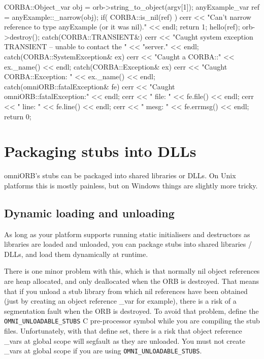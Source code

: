 \documentclass[11pt,twoside,a4paper]{book}
\newcommand{\code}[1]{\texttt{#1}}
\begin{document}
\begin{cxxlisting}
{{    {
      CORBA::Object_var obj = orb->string_to_object(argv[1]);
      anyExample_var ref = anyExample::_narrow(obj);
      if( CORBA::is_nil(ref) ) {
	cerr << "Can't narrow reference to type anyExample (or it was nil)."
	     << endl;
	return 1;
      }
      hello(ref);
    }
    orb->destroy();
  }
  catch(CORBA::TRANSIENT&) {
    cerr << "Caught system exception TRANSIENT -- unable to contact the "
         << "server." << endl;
  }
  catch(CORBA::SystemException& ex) {
    cerr << "Caught a CORBA::" << ex._name() << endl;
  }
  catch(CORBA::Exception& ex) {
    cerr << "Caught CORBA::Exception: " << ex._name() << endl;
  }
  catch(omniORB::fatalException& fe) {
    cerr << "Caught omniORB::fatalException:" << endl;
    cerr << "  file: " << fe.file() << endl;
    cerr << "  line: " << fe.line() << endl;
    cerr << "  mesg: " << fe.errmsg() << endl;
  }
  return 0;
}
\end{cxxlisting}



\chapter{Packaging stubs into DLLs}
\label{chap:dlls}


omniORB's stubs can be packaged into shared libraries or DLLs. On Unix
platforms this is mostly painless, but on Windows things are slightly
more tricky.


\section{Dynamic loading and unloading}

As long as your platform supports running static initialisers and
destructors as libraries are loaded and unloaded, you can package
stubs into shared libraries / DLLs, and load them dynamically at
runtime.

There is one minor problem with this, which is that normally nil
object references are heap allocated, and only deallocated when the
ORB is destroyed. That means that if you unload a stub library from
which nil references have been obtained (just by creating an object
reference \_var for example), there is a risk of a segmentation fault
when the ORB is destroyed. To avoid that problem, define the
\code{OMNI\_UNLOADABLE\_STUBS} C pre-processor symbol while you are
compiling the stub files. Unfortunately, with that define set, there
is a risk that object reference \_vars at global scope will segfault
as they are unloaded. You must not create \_vars at global scope if
you are using \code{OMNI\_UNLOADABLE\_STUBS}.
\end{document}
